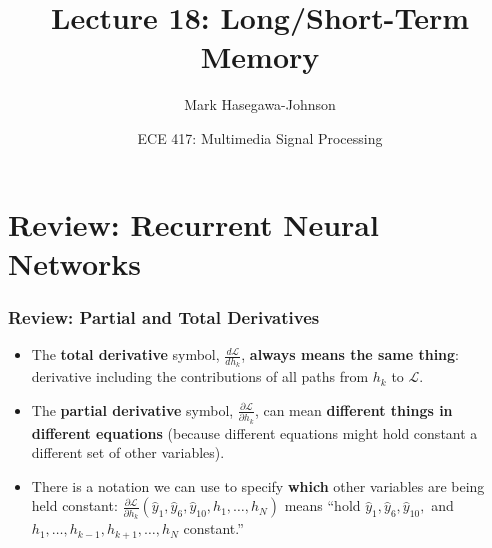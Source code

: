 \documentclass{beamer}
\title{Lecture 18: Long/Short-Term Memory}
\author{Mark Hasegawa-Johnson}
\date{ECE 417: Multimedia Signal Processing}
\institute{University of Illinois}
\begin{document}
\begin{frame}
  \maketitle
\end{frame}

\begin{frame}
  \tableofcontents
\end{frame}


\section[Review]{Review: Recurrent Neural Networks}
\setcounter{subsection}{1}

\begin{frame}
  \frametitle{Review: Partial and Total Derivatives}
  \begin{itemize}
  \item The {\bf total derivative} symbol, $\frac{d{\mathcal
      L}}{dh_k}$, {\bf always means the same thing}: derivative
    including the contributions of all paths from $h_k$ to ${\mathcal
      L}$.
  \item The {\bf partial derivative} symbol, $\frac{\partial{\mathcal
      L}}{\partial h_k}$, can mean {\bf different things in different
    equations} (because different equations might hold constant a
    different set of other variables).
  \item There is a notation we can use to specify {\bf which} other
    variables are being held constant: $\frac{\partial{\mathcal
        L}}{\partial
      h_k}(\hat{y}_1,\hat{y}_6,\hat{y}_{10},h_1,\ldots,h_N)$ means
    ``hold $\hat{y}_1,\hat{y}_6,\hat{y}_{10},$ and
    $h_1,\ldots,h_{k-1},h_{k+1},\ldots,h_N$ constant.''
  \end{itemize}
\end{frame}
\end{document}
